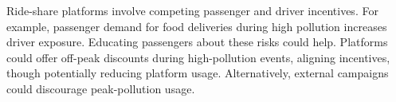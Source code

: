 Ride-share platforms involve competing passenger and driver incentives.
For example, passenger demand for food deliveries during high pollution increases driver exposure.
Educating passengers about these risks could help.
Platforms could offer off-peak discounts during high-pollution events, aligning incentives, though potentially reducing platform usage.
Alternatively, external campaigns could discourage peak-pollution usage.




